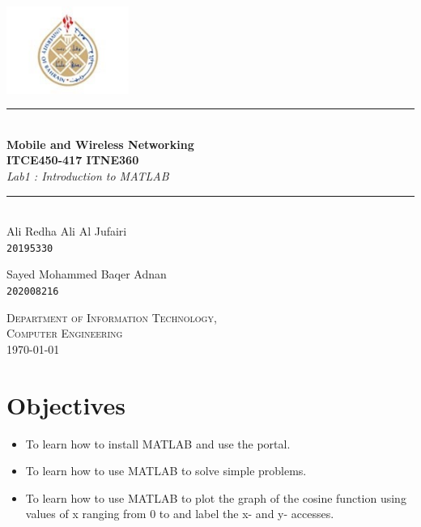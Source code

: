 \documentclass[12pt,a4paper]{article}
\newcommand{\HRule}{\rule{\linewidth}{0.5mm}}
\begin{document}
\begin{titlepage}
\begin{center}

\includegraphics[width=0.3\textwidth]{images/Picture2.jpg}~\\[2cm]


\HRule \\[0.4cm]
{ \LARGE 
  \textbf{Mobile and Wireless Networking }\\[0.4cm] 
  \textbf{ITCE450-417 ITNE360}\\[0.4cm]
  \emph{Lab1 : Introduction to MATLAB}\\[0.4cm]
}
\HRule \\[1.5cm]



{ \large
  Ali Redha Ali Al Jufairi \\[0.1cm]
  \texttt{20195330}
}

{ \large
  Sayed Mohammed Baqer Adnan\\[0.1cm]
  \texttt{202008216}
}
\vfill

\textsc{\large Department of Information Technology,\\Computer Engineering }\\[0.4cm]


{\large \today}
 
\end{center}
\end{titlepage}


\newpage



\section{Objectives}
\begin{itemize}
\item To learn how to install  MATLAB and use the portal.
\item To learn how to use MATLAB to solve simple problems.
\item  To learn how to use MATLAB to plot the graph of the cosine function using values of x ranging from 0 to and label the x- and y- accesses.
\end{itemize}
\end{document}
